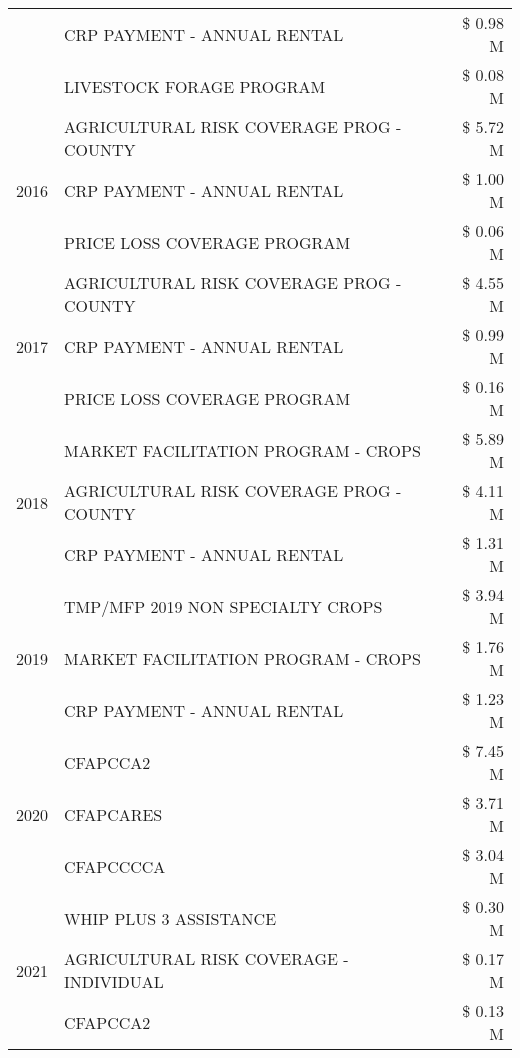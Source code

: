\begin{tabular}{llr}
 & CRP PAYMENT - ANNUAL RENTAL & \$ 0.98 M \\
 & LIVESTOCK FORAGE PROGRAM & \$ 0.08 M \\
\cline{1-3}
\multirow[t]{3}{*}{2016} & AGRICULTURAL RISK COVERAGE PROG - COUNTY & \$ 5.72 M \\
 & CRP PAYMENT - ANNUAL RENTAL & \$ 1.00 M \\
 & PRICE LOSS COVERAGE PROGRAM & \$ 0.06 M \\
\cline{1-3}
\multirow[t]{3}{*}{2017} & AGRICULTURAL RISK COVERAGE PROG - COUNTY & \$ 4.55 M \\
 & CRP PAYMENT - ANNUAL RENTAL & \$ 0.99 M \\
 & PRICE LOSS COVERAGE PROGRAM & \$ 0.16 M \\
\cline{1-3}
\multirow[t]{3}{*}{2018} & MARKET FACILITATION PROGRAM - CROPS & \$ 5.89 M \\
 & AGRICULTURAL RISK COVERAGE PROG - COUNTY & \$ 4.11 M \\
 & CRP PAYMENT - ANNUAL RENTAL & \$ 1.31 M \\
\cline{1-3}
\multirow[t]{3}{*}{2019} & TMP/MFP 2019 NON SPECIALTY CROPS & \$ 3.94 M \\
 & MARKET FACILITATION PROGRAM - CROPS & \$ 1.76 M \\
 & CRP PAYMENT - ANNUAL RENTAL & \$ 1.23 M \\
\cline{1-3}
\multirow[t]{3}{*}{2020} & CFAPCCA2 & \$ 7.45 M \\
 & CFAPCARES & \$ 3.71 M \\
 & CFAPCCCCA & \$ 3.04 M \\
\cline{1-3}
\multirow[t]{3}{*}{2021} & WHIP PLUS 3 ASSISTANCE & \$ 0.30 M \\
 & AGRICULTURAL RISK COVERAGE - INDIVIDUAL & \$ 0.17 M \\
 & CFAPCCA2 & \$ 0.13 M \\
\cline{1-3}
\bottomrule
\end{tabular}

